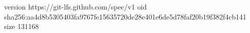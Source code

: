 version https://git-lfs.github.com/spec/v1
oid sha256:aa4d8b5305403fa9767fe15635720de28e401e6de5d78faf20b19f382f4cb141
size 131168
